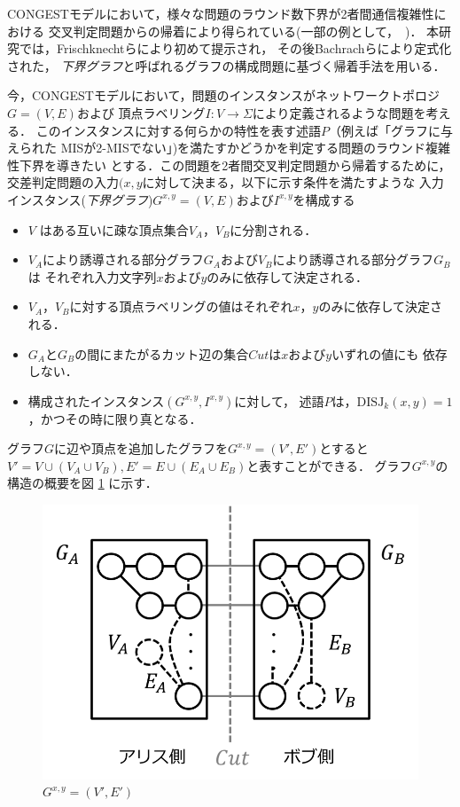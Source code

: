 \documentclass[12pt]{thesis}
\newcommand{\CONGEST}{\textsf{CONGEST}}
\theoremstyle{definition}
\begin{document}
{\CONGEST}モデルにおいて，様々な問題のラウンド数下界が2者間通信複雑性における
交叉判定問題からの帰着により得られている(一部の例として，~\cite{sarma2012distributed,fischer2018possibilities,czumaj2020detecting})．
本研究では，Frischknechtら\cite{frischknecht2012networks}により初めて提示され，
その後Bachrachら\cite{bacrach2019hardness}により定式化された，
\emph{下界グラフ}と呼ばれるグラフの構成問題に基づく帰着手法を用いる．

今，{\CONGEST}モデルにおいて，問題のインスタンスがネットワークトポロジ$G = (V, E)$および
頂点ラベリング$I : V \to \Sigma$により定義されるような問題を考える．
このインスタンスに対する何らかの特性を表す述語$P$（例えば「グラフに与えられた
MISが2-MISでない」)を満たすかどうかを判定する問題のラウンド複雑性下界を導きたい
とする．この問題を2者間交叉判定問題から帰着するために，
交差判定問題の入力$(x, y$に対して決まる，以下に示す条件を満たすような
入力インスタンス(\emph{下界グラフ})$G^{x, y} = (V, E)$および$I^{x, y}$を構成する

\begin{itemize}
\item $V$ はある互いに疎な頂点集合$V_A$，$V_B$に分割される．
\item $V_A$により誘導される部分グラフ$G_A$および$V_B$により誘導される部分グラフ$G_B$は
それぞれ入力文字列$x$および$y$のみに依存して決定される．
\item $V_A$，$V_B$に対する頂点ラベリングの値はそれぞれ$x$，$y$のみに依存して決定される．
\item $G_A$と$G_B$の間にまたがるカット辺の集合$Cut$は$x$および$y$いずれの値にも
依存しない．
\item 構成されたインスタンス$(G^{x,y}, I^{x,y})$に対して，
述語$P$は，$\mathrm{DISJ}_{k} (x, y)=1$，かつその時に限り真となる．
\end{itemize}
グラフ$G$に辺や頂点を追加したグラフを$G^{x, y} = (V', E')$とすると
$V' = V \cup (V_{A} \cup V_{B}), E' = E \cup (E_{A} \cup E_{B})$と表すことができる．
グラフ$G^{x, y}$の構造の概要を図 \ref{Gxy} に示す．

\begin{figure}[ht]
\begin{center}
\includegraphics[width=120mm]{Gxy.png}
\end{center}
\caption{$G^{x, y} = (V', E')$}
\label{Gxy}
\end{figure}
\end{document}
